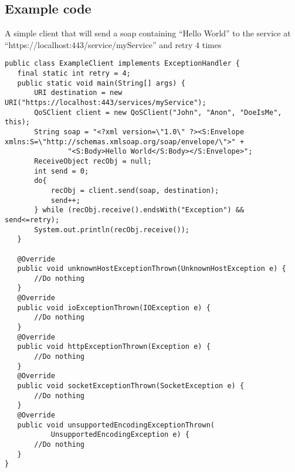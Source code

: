 \subsection{Example code}\label{userguideExample}

A simple client that will send a soap containing “Hello World” to the service at “https://localhost:443/service/myService” and retry 4 times

\begin{lstlisting}[caption={A simple example client}, label=userguideExampleclient]
public class ExampleClient implements ExceptionHandler {
   final static int retry = 4;
   public static void main(String[] args) {
       URI destination = new URI("https://localhost:443/services/myService");
       QoSClient client = new QoSClient("John", "Anon", "DoeIsMe", this);
       String soap = "<?xml version=\"1.0\" ?><S:Envelope xmlns:S=\"http://schemas.xmlsoap.org/soap/envelope/\">" +
               "<S:Body>Hello World</S:Body></S:Envelope>";
       ReceiveObject recObj = null;
       int send = 0;
       do{
           recObj = client.send(soap, destination);
           send++;
       } while (recObj.receive().endsWith("Exception") && send<=retry);
       System.out.println(recObj.receive());
   }

   @Override
   public void unknownHostExceptionThrown(UnknownHostException e) {
       //Do nothing
   }
   @Override
   public void ioExceptionThrown(IOException e) {
       //Do nothing
   }
   @Override
   public void httpExceptionThrown(Exception e) {
       //Do nothing    
   }
   @Override
   public void socketExceptionThrown(SocketException e) {
       //Do nothing    
   }
   @Override
   public void unsupportedEncodingExceptionThrown(
           UnsupportedEncodingException e) {
       //Do nothing    
   }
}
\end{lstlisting}
